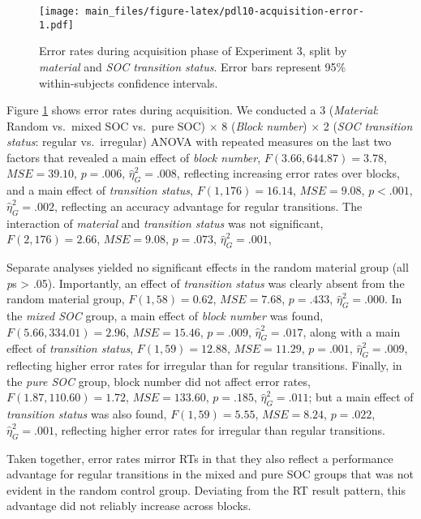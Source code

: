 \documentclass[english,,man]{apa6}
\begin{document}
\begin{figure}
\centering
\texttt{[image: main\_files/figure-latex/pdl10-acquisition-error-1.pdf]}
\caption{\label{fig:pdl10-acquisition-error}Error rates during acquisition phase of Experiment 3, split by \emph{material} and \emph{SOC transition status}. Error bars represent 95\% within-subjects confidence intervals.}
\end{figure}

Figure \ref{fig:pdl10-acquisition-error} shows error rates during acquisition.
We conducted a 3 (\emph{Material}: Random vs.~mixed SOC vs.~pure SOC) \(\times\) 8 (\emph{Block number}) \(\times\) 2 (\emph{SOC transition status}: regular vs.~irregular) ANOVA with repeated measures on the last two factors that revealed
a main effect of \emph{block number}, \(F(3.66, 644.87) = 3.78\), \(\mathit{MSE} = 39.10\), \(p = .006\), \(\hat{\eta}^2_G = .008\),
reflecting increasing error rates over blocks,
and a main effect of \emph{transition status}, \(F(1, 176) = 16.14\), \(\mathit{MSE} = 9.08\), \(p < .001\), \(\hat{\eta}^2_G = .002\),
reflecting an accuracy advantage for regular transitions.
The interaction of \emph{material} and \emph{transition status} was not significant, \(F(2, 176) = 2.66\), \(\mathit{MSE} = 9.08\), \(p = .073\), \(\hat{\eta}^2_G = .001\),

Separate analyses yielded no significant effects in the random material group (all \emph{p}s \textgreater{} .05).
Importantly, an effect of \emph{transition status} was clearly absent from the random material group, \(F(1, 58) = 0.62\), \(\mathit{MSE} = 7.68\), \(p = .433\), \(\hat{\eta}^2_G = .000\).
In the \emph{mixed SOC} group, a main effect of \emph{block number} was found,
\(F(5.66, 334.01) = 2.96\), \(\mathit{MSE} = 15.46\), \(p = .009\), \(\hat{\eta}^2_G = .017\),
along with a main effect of \emph{transition status},
\(F(1, 59) = 12.88\), \(\mathit{MSE} = 11.29\), \(p = .001\), \(\hat{\eta}^2_G = .009\),
reflecting higher error rates for irregular than for regular transitions.
Finally, in the \emph{pure SOC} group, block number did not affect error rates, \(F(1.87, 110.60) = 1.72\), \(\mathit{MSE} = 133.60\), \(p = .185\), \(\hat{\eta}^2_G = .011\);
but a main effect of \emph{transition status} was also found,
\(F(1, 59) = 5.55\), \(\mathit{MSE} = 8.24\), \(p = .022\), \(\hat{\eta}^2_G = .001\), reflecting higher error rates for irregular than regular transitions.

Taken together, error rates mirror RTs in that they also reflect a performance advantage for regular transitions in the mixed and pure SOC groups that was not evident in the random control group.
Deviating from the RT result pattern, this advantage did not reliably increase across blocks.
\end{document}
